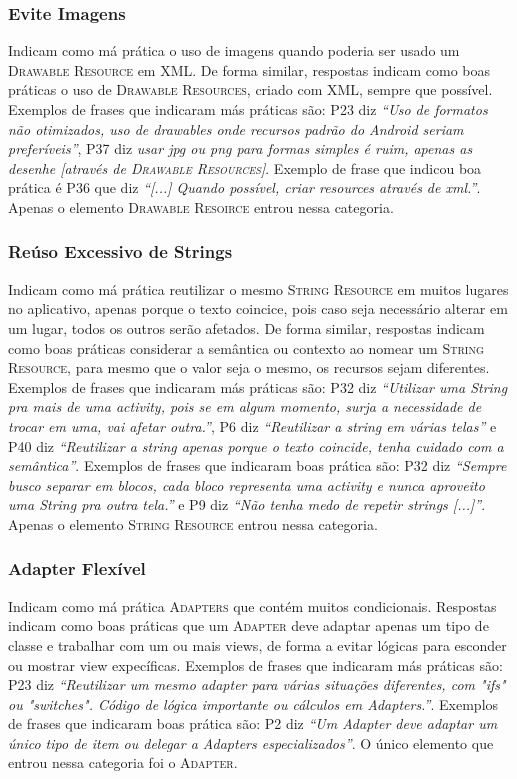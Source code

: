 \subsubsection{Evite Imagens}
Indicam como má prática o uso de imagens quando poderia ser usado um \textsc{Drawable Resource} em XML. De forma similar, respostas indicam como boas práticas o uso de \textsc{Drawable Resources}, criado com XML, sempre que possível. Exemplos de frases que indicaram más práticas são: P23 diz \textit{``Uso de formatos não otimizados, uso de drawables onde recursos padrão do Android seriam preferíveis''}, P37 diz \textit{usar jpg ou png para formas simples é ruim, apenas as desenhe [através de \textsc{Drawable Resources}]}. Exemplo de frase que indicou boa prática é P36 que diz \textit{``[...] Quando possível, criar resources através de xml.''}. Apenas o elemento \textsc{Drawable Resoirce} entrou nessa categoria. 

\subsubsection{Reúso Excessivo de Strings}
Indicam como má prática reutilizar o mesmo \textsc{String Resource} em muitos lugares no aplicativo, apenas porque o texto coincice, pois caso seja necessário alterar em um lugar, todos os outros serão afetados. De forma similar, respostas indicam como boas práticas considerar a semântica ou contexto ao nomear um \textsc{String Resource}, para mesmo que o valor seja o mesmo, os recursos sejam diferentes. Exemplos de frases que indicaram más práticas são: P32 diz \textit{``Utilizar uma String pra mais de uma activity, pois se em algum momento, surja a necessidade de trocar em uma, vai afetar outra.''}, P6 diz \textit{``Reutilizar a string em várias telas''} e P40 diz \textit{``Reutilizar a string apenas porque o texto coincide, tenha cuidado com a semântica''}. Exemplos de frases que indicaram boas prática são: P32 diz \textit{``Sempre busco separar em blocos, cada bloco representa uma activity e nunca aproveito uma String pra outra tela.''} e P9 diz \textit{``Não tenha medo de repetir strings [...]''}. Apenas o elemento \textsc{String Resource} entrou nessa categoria. 

\subsubsection{Adapter Flexível}
Indicam como má prática \textsc{Adapters} que contém muitos condicionais. Respostas indicam como boas práticas que um \textsc{Adapter} deve adaptar apenas um tipo de classe e trabalhar com um ou mais views, de forma a evitar lógicas para esconder ou mostrar view expecíficas. Exemplos de frases que indicaram más práticas são: P23 diz \textit{``Reutilizar um mesmo adapter para várias situações diferentes, com "ifs" ou "switches". Código de lógica importante ou cálculos em Adapters.''}. Exemplos de frases que indicaram boas prática são: P2 diz \textit{``Um Adapter deve adaptar um único tipo de item ou delegar a Adapters especializados''}. O único elemento que entrou nessa categoria foi o \textsc{Adapter}. 

